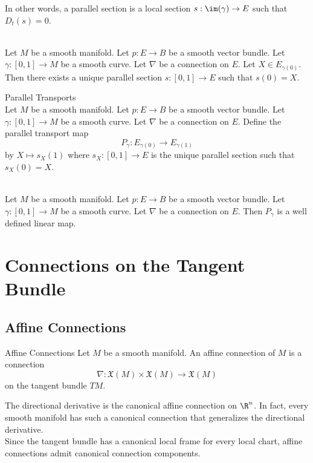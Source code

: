 \documentclass[a4paper]{article}
\begin{document}
In other words, a parallel section is a local section $s:\im(\gamma)\to E$ such that $D_t(s)=0$. 

\begin{prp}{}{}\\
Let $M$ be a smooth manifold. Let $p:E\to B$ be a smooth vector bundle. Let $\gamma:[0,1]\to M$ be a smooth curve. Let $\nabla$ be a connection on $E$. Let $X\in E_{\gamma(0)}$. Then there exists a unique parallel section $s:[0,1]\to E$ such that $s(0)=X$. 
\end{prp}

\begin{defn}{Parallel Transports}{}\\
Let $M$ be a smooth manifold. Let $p:E\to B$ be a smooth vector bundle. Let $\gamma:[0,1]\to M$ be a smooth curve. Let $\nabla$ be a connection on $E$. Define the parallel transport map $$P_\gamma:E_{\gamma(0)}\to E_{\gamma(1)}$$ by $X\mapsto s_X(1)$ where $s_X:[0,1]\to E$ is the unique parallel section such that $s_X(0)=X$. 
\end{defn}

\begin{lmm}{}{}\\
Let $M$ be a smooth manifold. Let $p:E\to B$ be a smooth vector bundle. Let $\gamma:[0,1]\to M$ be a smooth curve. Let $\nabla$ be a connection on $E$. Then $P_\gamma$ is a well defined linear map. 
\end{lmm}

\pagebreak
\section{Connections on the Tangent Bundle}
\subsection{Affine Connections}
\begin{defn}{Affine Connections}{} Let $M$ be a smooth manifold. An affine connection of $M$ is a connection $$\nabla:\mathfrak{X}(M)\times\mathfrak{X}(M)\to\mathfrak{X}(M)$$ on the tangent bundle $TM$. 
\end{defn}

The directional derivative is the canonical affine connection on $\R^n$. In fact, every smooth manifold has such a canonical connection that generalizes the directional derivative. \\

Since the tangent bundle has a canonical local frame for every local chart, affine connections admit canonical connection components. 
\end{document}
